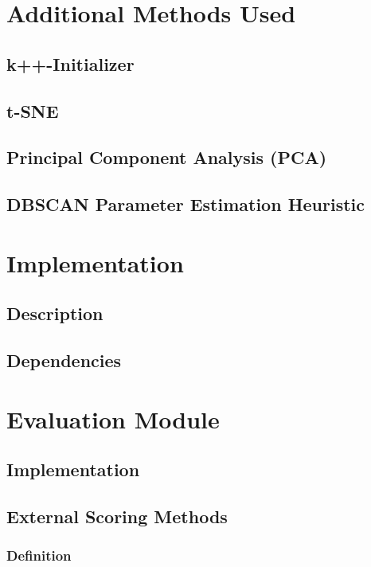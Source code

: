 \documentclass[12pt, english]
{article}
\begin{document}
\section{Additional Methods Used}
\subsection{k++-Initializer}

\subsection{t-SNE}

\subsection{Principal Component Analysis (PCA)}

\subsection{DBSCAN Parameter Estimation Heuristic} \label{dbscanheuristic}


\section{Implementation}
\subsection{Description}

\subsection{Dependencies}


\section{Evaluation Module}
\subsection{Implementation}

\subsection{External Scoring Methods}
\subsubsection{Definition}

\end{document}
